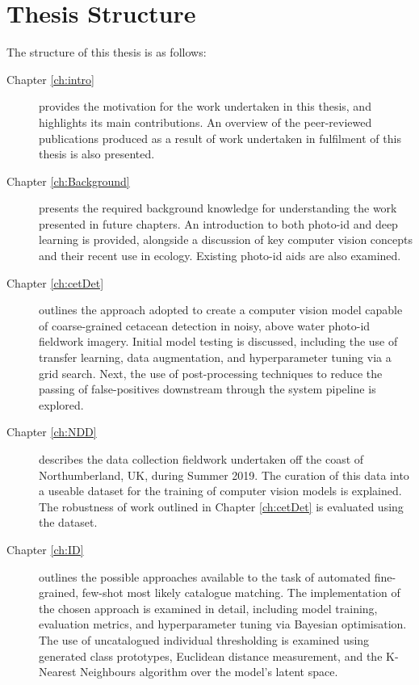 \section{Thesis Structure}\label{ch:intro,sec:Structure}

The structure of this thesis is as follows:

\begin{description}
	\item[Chapter \ref{ch:intro}] provides the motivation for the work undertaken in this thesis, and highlights its main contributions. An overview of the peer-reviewed publications produced as a result of work undertaken in fulfilment of this thesis is also presented.
	
	\item[Chapter \ref{ch:Background}] presents the required background knowledge for understanding the work presented in future chapters. An introduction to both photo-id and deep learning is provided, alongside a discussion of key computer vision concepts and their recent use in ecology. Existing photo-id aids are also examined.
	
	\newpage
	
	\item[Chapter \ref{ch:cetDet}] outlines the approach adopted to create a computer vision model capable of coarse-grained cetacean detection in noisy, above water photo-id fieldwork imagery. Initial model testing is discussed, including the use of transfer learning, data augmentation, and hyperparameter tuning via a grid search. Next, the use of post-processing techniques to reduce the passing of false-positives downstream through the system pipeline is explored. 
	
	\item[Chapter \ref{ch:NDD}] describes the data collection fieldwork undertaken off the coast of Northumberland, UK, during Summer 2019. The curation of this data into a useable dataset for the training of computer vision models is explained. The robustness of work outlined in Chapter \ref{ch:cetDet} is evaluated using the dataset. 
	
	\item[Chapter \ref{ch:ID}] outlines the possible approaches available to the task of automated fine-grained, few-shot most likely catalogue matching. The implementation of the chosen approach is examined in detail, including model training, evaluation metrics, and hyperparameter tuning via Bayesian optimisation. The use of uncatalogued individual thresholding is examined using generated class prototypes, Euclidean distance measurement, and the K-Nearest Neighbours algorithm over the model's latent space. 
	

\end{description}
